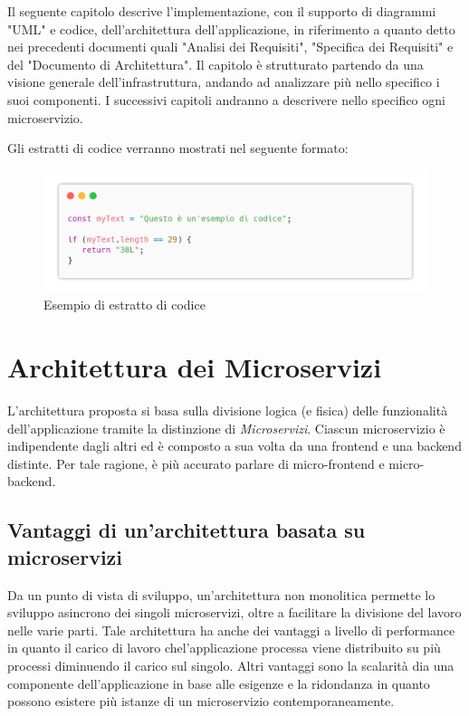 \documentclass{report}
\begin{document}
Il seguente capitolo descrive l'implementazione, con il supporto di diagrammi "UML" e codice, dell'architettura dell'applicazione, in riferimento a quanto detto nei precedenti documenti quali "Analisi dei Requisiti", "Specifica dei Requisiti" e del "Documento di Architettura".  Il capitolo è strutturato partendo da una visione generale dell'infrastruttura, andando ad analizzare più nello specifico i suoi componenti. I successivi capitoli andranno a descrivere nello specifico ogni microservizio.


Gli estratti di codice verranno mostrati nel seguente formato:
\begin{figure}[H]
	\centering\includegraphics[width=1\textwidth]{images/example_code_01.png}
	Esempio di estratto di codice
\end{figure}

\section{Architettura dei Microservizi}

L'architettura proposta si basa sulla divisione logica (e fisica) delle funzionalità dell'applicazione tramite la distinzione di \textit{Microservizi}. Ciascun microservizio è indipendente dagli altri ed è composto a sua volta da una frontend e una backend distinte. Per tale ragione, è più accurato parlare di micro-frontend e micro-backend.

\subsection*{Vantaggi di un'architettura basata su microservizi}

Da un punto di vista di sviluppo, un'architettura non monolitica permette lo sviluppo asincrono dei singoli microservizi, oltre a facilitare la divisione del lavoro nelle varie parti. Tale architettura ha anche dei vantaggi a livello di performance in quanto il carico di lavoro chel'applicazione processa viene distribuito su più processi diminuendo il carico sul singolo. Altri vantaggi sono la scalarità dia una componente dell'applicazione in base alle esigenze e la ridondanza in quanto possono esistere più istanze di un microservizio contemporaneamente.
\end{document}
